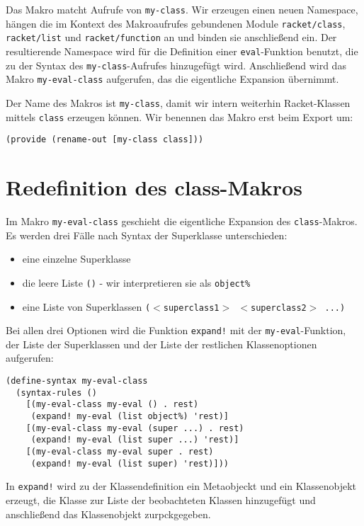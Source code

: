 Das Makro matcht Aufrufe von \texttt{my-class}. Wir erzeugen einen neuen Namespace, hängen die im Kontext des Makroaufrufes gebundenen Module \texttt{racket/class}, \texttt{racket/list} und \texttt{racket/function} an und binden sie anschließend ein. Der resultierende Namespace wird für die Definition einer \texttt{eval}-Funktion benutzt, die zu der Syntax des \texttt{my-class}-Aufrufes hinzugefügt wird. Anschließend wird das Makro \texttt{my-eval-class} aufgerufen, das die eigentliche Expansion übernimmt.

Der Name des Makros ist \texttt{my-class}, damit wir intern weiterhin Racket-Klassen mittels \texttt{class} erzeugen können. Wir benennen das Makro erst beim Export um:

\begin{lstlisting}
(provide (rename-out [my-class class]))
\end{lstlisting}

\section{Redefinition des class-Makros}
Im Makro \texttt{my-eval-class} geschieht die eigentliche Expansion des \texttt{class}-Makros. Es werden drei Fälle nach Syntax der Superklasse unterschieden:
\begin{itemize}
 \item eine einzelne Superklasse 
 \item die leere Liste \texttt{()} - wir interpretieren sie als \texttt{object\%}
 \item eine Liste von Superklassen \texttt{($<$superclass1$>$ $<$superclass2$>$ ...)}
\end{itemize}

Bei allen drei Optionen wird die Funktion \texttt{expand!} mit der \texttt{my-eval}-Funktion, der Liste der Superklassen und der Liste der restlichen Klassenoptionen aufgerufen:

\begin{lstlisting}
(define-syntax my-eval-class
  (syntax-rules ()
    [(my-eval-class my-eval () . rest) 
     (expand! my-eval (list object%) 'rest)]
    [(my-eval-class my-eval (super ...) . rest)
     (expand! my-eval (list super ...) 'rest)]
    [(my-eval-class my-eval super . rest)
     (expand! my-eval (list super) 'rest)]))
\end{lstlisting}

In \texttt{expand!} wird zu der Klassendefinition ein Metaobjeckt und ein Klassenobjekt erzeugt, die Klasse zur Liste der beobachteten Klassen hinzugefügt und anschließend das Klassenobjekt zurpckgegeben.

